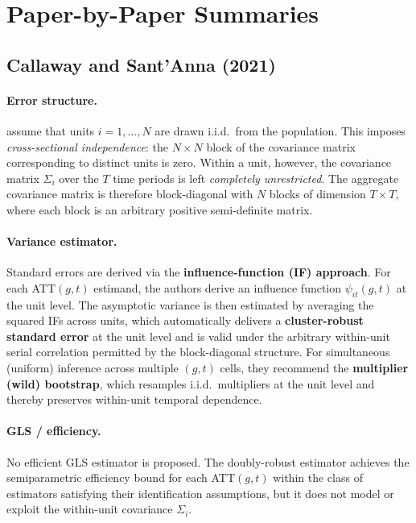 \documentclass[12pt]{article}
\begin{document}
\section{Paper-by-Paper Summaries}

\subsection{Callaway and Sant'Anna (2021)}

\paragraph{Error structure.}
\citet{callaway2021difference} assume that units $i = 1, \ldots, N$ are drawn
i.i.d.\ from the population.
This imposes \textit{cross-sectional independence}: the $N \times N$ block of the
covariance matrix corresponding to distinct units is zero.
Within a unit, however, the covariance matrix $\Sigma_i$ over the $T$ time periods
is left \textit{completely unrestricted}.
The aggregate covariance matrix is therefore block-diagonal with $N$ blocks of
dimension $T \times T$, where each block is an arbitrary positive semi-definite
matrix.

\paragraph{Variance estimator.}
Standard errors are derived via the \textbf{influence-function (IF) approach}.
For each ATT$(g,t)$ estimand, the authors derive an influence function
$\psi_{it}(g,t)$ at the unit level.
The asymptotic variance is then estimated by averaging the squared IFs across
units, which automatically delivers a \textbf{cluster-robust standard error}
at the unit level and is valid under the arbitrary within-unit serial
correlation permitted by the block-diagonal structure.
For simultaneous (uniform) inference across multiple $(g,t)$ cells, they
recommend the \textbf{multiplier (wild) bootstrap}, which resamples i.i.d.\
multipliers at the unit level and thereby preserves within-unit temporal
dependence.

\paragraph{GLS / efficiency.}
No efficient GLS estimator is proposed.
The doubly-robust estimator achieves the semiparametric efficiency bound for
each ATT$(g,t)$ within the class of estimators satisfying their identification
assumptions, but it does not model or exploit the within-unit covariance
$\Sigma_i$.
\end{document}
